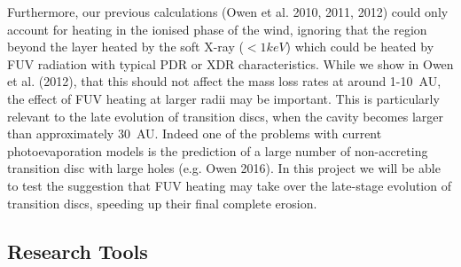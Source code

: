 \documentclass[10pt,fleqn,twoside]{article}
\begin{document}
Furthermore, our previous calculations (Owen et al. 2010, 2011, 2012)
could only account for heating 
in the ionised phase of the wind, ignoring that the region beyond the
layer heated by the soft X-ray ($<1keV$) which could be heated by FUV
radiation with typical PDR or XDR characteristics. While we show in
Owen et al. (2012), that this should not affect the mass loss rates at
around 1-10~AU, the effect of FUV heating at larger radii may be
important. This is particularly relevant to the late evolution of
transition discs, when the cavity becomes larger than approximately
30~AU. Indeed one of the
problems with current photoevaporation models is the prediction of a
large number of non-accreting transition disc with large holes
(e.g. Owen 2016). In this project we will be able to test the
suggestion that FUV heating may take over the late-stage evolution of
transition discs, speeding up their final complete erosion. 



\subsection{Research Tools}
\end{document}
